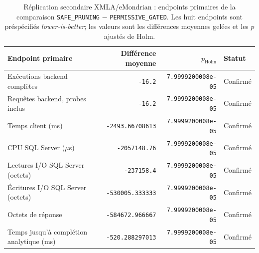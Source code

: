 \begin{table}[!t]
\centering
\caption{Réplication secondaire XMLA/eMondrian : endpoints primaires de la comparaison \texttt{SAFE\_PRUNING} $-$ \texttt{PERMISSIVE\_GATED}. Les huit endpoints sont préspécifiés \emph{lower-is-better}; les valeurs sont les différences moyennes gelées et les $p$ ajustés de Holm.}
\label{tab:r3e14-primary-endpoints}
\scriptsize
\setlength{\tabcolsep}{4pt}
\renewcommand{\arraystretch}{1.08}
\begin{tabularx}{\textwidth}{@{}X r r l@{}}
\toprule
Endpoint primaire & Différence moyenne & $p_{\mathrm{Holm}}$ & Statut \\
\midrule
Exécutions backend complètes & \texttt{-16.2} & \texttt{7.9999200008e-05} & Confirmé \\
Requêtes backend, probes inclus & \texttt{-16.2} & \texttt{7.9999200008e-05} & Confirmé \\
Temps client (ms) & \texttt{-2493.66708613} & \texttt{7.9999200008e-05} & Confirmé \\
CPU SQL Server ($\mu$s) & \texttt{-2057148.76} & \texttt{7.9999200008e-05} & Confirmé \\
Lectures I/O SQL Server (octets) & \texttt{-237158.4} & \texttt{7.9999200008e-05} & Confirmé \\
Écritures I/O SQL Server (octets) & \texttt{-530005.333333} & \texttt{7.9999200008e-05} & Confirmé \\
Octets de réponse & \texttt{-584672.966667} & \texttt{7.9999200008e-05} & Confirmé \\
Temps jusqu'à complétion analytique (ms) & \texttt{-520.288297013} & \texttt{7.9999200008e-05} & Confirmé \\
\bottomrule
\end{tabularx}
\end{table}
